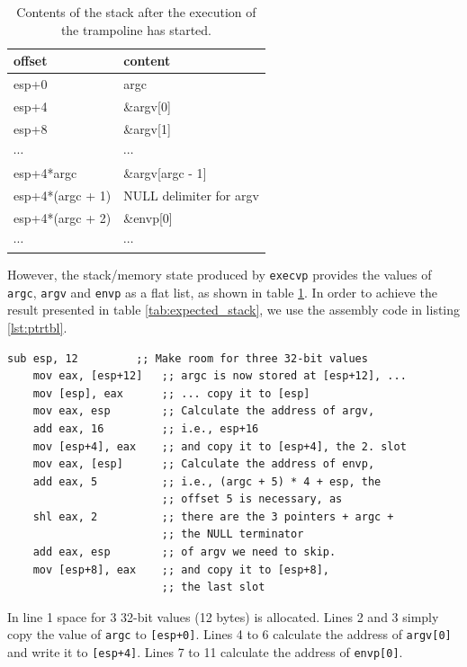\documentclass[draft,final]{vutinfth} %
\begin{document}
\begin{table}[H]
    \centering
    \begin{tabular}{|l|l|}
    \hline
    offset & content       \\ \hline\hline
    esp+0  & argc          \\ \hline
    esp+4  & \&argv{[}0{]} \\ \hline
    esp+8  & \&argv{[}1{]} \\ \hline
    $\cdots$ & $\cdots$ \\ \hline
    esp+4*argc  & \&argv{[}argc - 1{]} \\ \hline
    esp+4*(argc + 1)  & NULL delimiter for argv \\ \hline
    esp+4*(argc + 2)  & \&envp{[}0{]} \\ \hline
    $\cdots$ & $\cdots$ \\ \hline
    \end{tabular}
    \caption{Contents of the stack after the execution of the trampoline has started.}
    \label{tab:given_stack}
\end{table}

However, the stack/memory state produced by \texttt{execvp} provides the values of \texttt{argc}, \texttt{argv} and \texttt{envp} as a flat list, as shown in table \ref{tab:given_stack}. In order to achieve the result presented in table \ref{tab:expected_stack}, we use the assembly code in listing \ref{lst:ptrtbl}.

\begin{lstlisting}[language={[x86masm]Assembler}, caption={Assembly used to prepare the pointer table required by \texttt{a.out} executables}, label={lst:ptrtbl}]
    sub esp, 12         ;; Make room for three 32-bit values
    mov eax, [esp+12]   ;; argc is now stored at [esp+12], ...
    mov [esp], eax      ;; ... copy it to [esp]
    mov eax, esp        ;; Calculate the address of argv,
    add eax, 16         ;; i.e., esp+16
    mov [esp+4], eax    ;; and copy it to [esp+4], the 2. slot
    mov eax, [esp]      ;; Calculate the address of envp,
    add eax, 5          ;; i.e., (argc + 5) * 4 + esp, the
                        ;; offset 5 is necessary, as
    shl eax, 2          ;; there are the 3 pointers + argc +
                        ;; the NULL terminator 
    add eax, esp        ;; of argv we need to skip.
    mov [esp+8], eax    ;; and copy it to [esp+8],
                        ;; the last slot
\end{lstlisting}

In line 1 space for 3 32-bit values (12 bytes) is allocated. Lines 2 and 3 simply copy the value of \texttt{argc} to \texttt{[esp+0]}. Lines 4 to 6 calculate the address of \texttt{argv[0]} and write it to \texttt{[esp+4]}. Lines 7 to 11 calculate the address of \texttt{envp[0]}.
\end{document}

